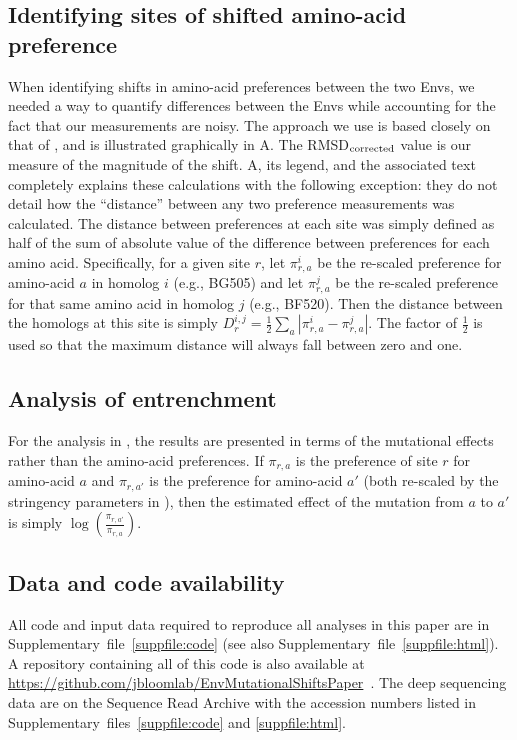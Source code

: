 \documentclass[9pt]{elife}
\begin{document}
\subsection{Identifying sites of shifted amino-acid preference}
When identifying shifts in amino-acid preferences between the two Envs, we needed a way to quantify differences between the Envs while accounting for the fact that our measurements are noisy.
The approach we use is based closely on that of \citet{doud2015site}, and is illustrated graphically in A.
The RMSD$_{\rm{corrected}}$ value is our measure of the magnitude of the shift.
A, its legend, and the associated text completely explains these calculations with the following exception: they do not detail how the ``distance'' between any two preference measurements was calculated. 
The distance between preferences at each site was simply defined as half of the sum of absolute value of the difference between preferences for each amino acid.
Specifically, for a given site $r$, let $\pi_{r,a}^{i}$ be the re-scaled preference for amino-acid $a$ in homolog $i$ (e.g., BG505) and let $\pi_{r,a}^{j}$ be the re-scaled preference for that same amino acid in homolog $j$ (e.g., BF520). 
Then the distance between the homologs at this site is simply $D_{r}^{i,j} = \frac{1}{2}\sum_{a}|\pi_{r,a}^{i}-\pi_{r,a}^{j}|$.
The factor of $\frac{1}{2}$ is used so that the maximum distance will always fall between zero and one.

\subsection{Analysis of entrenchment}
For the analysis in , the results are presented in terms of the mutational effects rather than the amino-acid preferences. 
If $\pi_{r,a}$ is the preference of site $r$ for amino-acid $a$ and $\pi_{r,a'}$ is the preference for amino-acid $a'$ (both re-scaled by the stringency parameters in ), then the estimated effect of the mutation from $a$ to $a'$ is simply $\log\left(\frac{\pi_{r,a'}}{\pi_{r,a}}\right)$.

\subsection{Data and code availability}
All code and input data required to reproduce all analyses in this paper are in Supplementary~file~\ref{suppfile:code} (see also Supplementary~file~\ref{suppfile:html}).
A repository containing all of this code is also available at \url{https://github.com/jbloomlab/EnvMutationalShiftsPaper}~\citep[][copy archived at \url{https://github.com/elifesciences-publications/EnvMutationalShiftsPaper}]{haddox2018github}.
The deep sequencing data are on the Sequence Read Archive with the accession numbers listed in Supplementary~files~\ref{suppfile:code} and \ref{suppfile:html}.
\end{document}
